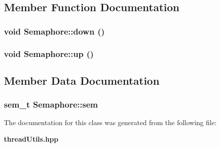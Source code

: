 \subsection{Member Function Documentation}
\subsubsection{\setlength{\rightskip}{0pt plus 5cm}void Semaphore::down ()\hspace{0.3cm}{\tt  [inline]}}\label{classSemaphore_71126a13a22f2722e22a2b69860a5371}


\subsubsection{\setlength{\rightskip}{0pt plus 5cm}void Semaphore::up ()\hspace{0.3cm}{\tt  [inline]}}\label{classSemaphore_15fb190263808234fc2562f39f523082}




\subsection{Member Data Documentation}
\subsubsection{\setlength{\rightskip}{0pt plus 5cm}sem\_\-t {\bf Semaphore::sem}\hspace{0.3cm}{\tt  [private]}}\label{classSemaphore_23e62b0971c229ddf106e3ff71d688d6}




The documentation for this class was generated from the following file:\begin{CompactItemize}
\item 
{\bf thread\-Utils.hpp}\end{CompactItemize}
